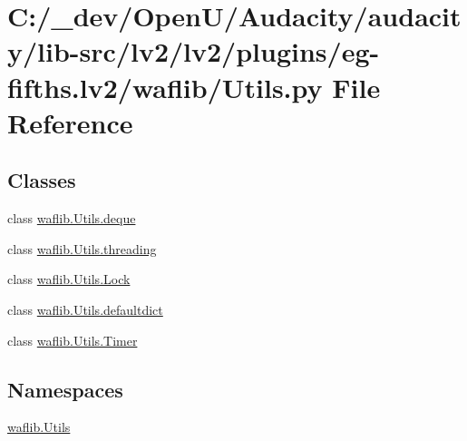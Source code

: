 \hypertarget{lv2_2plugins_2eg-fifths_8lv2_2waflib_2_utils_8py}{}\section{C\+:/\+\_\+dev/\+Open\+U/\+Audacity/audacity/lib-\/src/lv2/lv2/plugins/eg-\/fifths.lv2/waflib/\+Utils.py File Reference}
\label{lv2_2plugins_2eg-fifths_8lv2_2waflib_2_utils_8py}
\subsection*{Classes}
\begin{DoxyCompactItemize}
\item 
class \hyperlink{classwaflib_1_1_utils_1_1deque}{waflib.\+Utils.\+deque}
\item 
class \hyperlink{classwaflib_1_1_utils_1_1threading}{waflib.\+Utils.\+threading}
\item 
class \hyperlink{classwaflib_1_1_utils_1_1_lock}{waflib.\+Utils.\+Lock}
\item 
class \hyperlink{classwaflib_1_1_utils_1_1defaultdict}{waflib.\+Utils.\+defaultdict}
\item 
class \hyperlink{classwaflib_1_1_utils_1_1_timer}{waflib.\+Utils.\+Timer}
\end{DoxyCompactItemize}
\subsection*{Namespaces}
\begin{DoxyCompactItemize}
\item 
 \hyperlink{namespacewaflib_1_1_utils}{waflib.\+Utils}
\end{DoxyCompactItemize}
